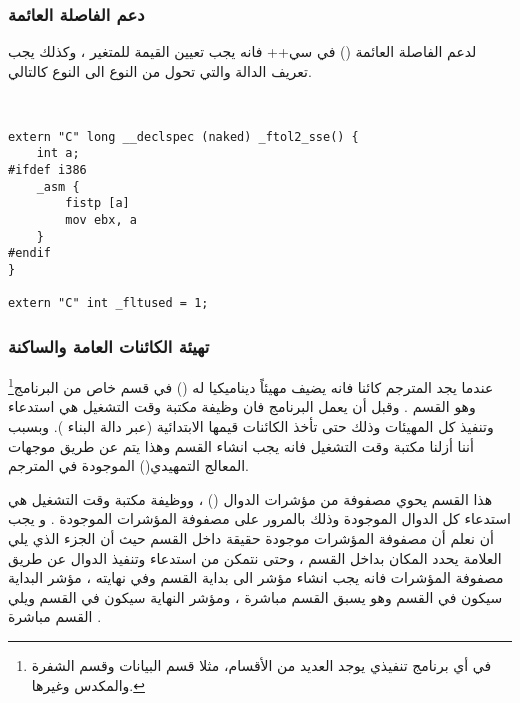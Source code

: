 \documentclass[document.tex]{subfiles}
\begin{document}
\subsubsection{دعم الفاصلة العائمة }
لدعم الفاصلة العائمة () في سي++ فانه يجب تعيين القيمة  للمتغير  ، وكذلك يجب تعريف الدالة  والتي تحول من النوع  الى النوع  كالتالي.

\begin{english}

\lstset{numberstyle=\tiny,numbers=left,stepnumber=1,numbersep=5pt,tabsize=2,extendedchars=true,breaklines=true,frame=b,showspaces=false, showtabs=false,xleftmargin=10pt,framexleftmargin=10pt,framexrightmargin=5pt,framexbottommargin=4pt,showstringspaces=false,language=C++}

\begin{lstlisting}[label=lst:fp,caption=\en{Floating Point Support}]


extern "C" long __declspec (naked) _ftol2_sse() {
	int a;
#ifdef i386
	_asm {
		fistp [a]
		mov	ebx, a
	}
#endif
}

extern "C" int _fltused = 1;

\end{lstlisting}
\end{english}

\subsubsection{تهيئة الكائنات العامة والساكنة}
عندما يجد المترجم كائنا فانه يضيف مهيئاً ديناميكيا له () في قسم خاص من البرنامج\footnote{في أي برنامج تنفيذي يوجد العديد من الأقسام، مثلا قسم البيانات  وقسم الشفرة  والمكدس  وغيرها.} وهو القسم . وقبل أن يعمل البرنامج فان وظيفة مكتبة وقت التشغيل هي استدعاء وتنفيذ كل المهيئات وذلك حتى تأخذ الكائنات قيمها الابتدائية (عبر  دالة البناء ). وبسبب أننا أزلنا مكتبة وقت التشغيل فانه يجب انشاء القسم  وهذا يتم عن طريق موجهات المعالج  التمهيدي() الموجودة في المترجم.

هذا القسم  يحوي مصفوفة من مؤشرات الدوال () ، ووظيفة مكتبة وقت التشغيل هي استدعاء كل الدوال الموجودة وذلك بالمرور على مصفوفة المؤشرات الموجودة . و يجب أن نعلم أن مصفوفة المؤشرات موجودة حقيقة داخل القسم  حيث أن الجزء الذي يلي العلامة  يحدد المكان بداخل القسم ،  وحتى نتمكن من استدعاء وتنفيذ الدوال عن طريق مصفوفة المؤشرات فانه يجب انشاء مؤشر الى بداية القسم  وفي نهايته ، مؤشر البداية سيكون في القسم   وهو يسبق القسم  مباشرة ، ومؤشر النهاية سيكون في القسم  ويلي القسم  مباشرة .
\end{document}
